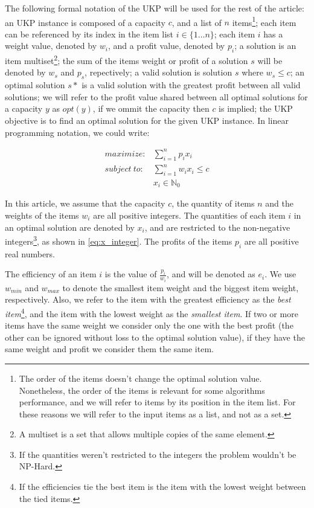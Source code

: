 \documentclass[runningheads,a4paper]{llncs}
\begin{document}
The following formal notation of the UKP will be used for the rest of the article: an UKP instance is composed of a capacity \(c\), and a list of \(n\) items\footnote{The order of the items doesn't change the optimal solution value. Nonetheless, the order of the items is relevant for some algorithms performance, and we will refer to items by its position in the item list. For these reasons we will refer to the input items as a list, and not as a set.}; each item can be referenced by its index in the item list \(i \in \{1\dots n\}\); each item \(i\) has a weight value, denoted by \(w_i\), and a profit value, denoted by \(p_i\); a solution is an item multiset\footnote{A multiset is a set that allows multiple copies of the same element.}; the sum of the items weight or profit of a solution \(s\) will be denoted by \(w_s\) and \(p_s\), repectively; a valid solution is solution \(s\) where \(w_s \leq c\); an optimal solution \(s*\) is a valid solution with the greatest profit between all valid solutions; we will refer to the profit value shared between all optimal solutions for a capacity \(y\) as \(opt(y)\), if we ommit the capacity then \(c\) is implied; the UKP objective is to find an optimal solution for the given UKP instance. In linear programming notation, we could write:

\begin{align}
  maximize: &\sum_{i=1}^n p_i x_i\label{eq:objfun}\\
subject~to: &\sum_{i=1}^n w_i x_i \leq c\label{eq:capcons}\\
            &x_i \in \mathbb{N}_0\label{eq:x_integer}
\end{align}

In this article, we assume that the capacity \(c\), the quantity of items \(n\) and the weights of the items \(w_i\) are all positive integers. The quantities of each item \(i\) in an optimal solution are denoted by \(x_i\), and are restricted to the non-negative integers\footnote{If the quantities weren't restricted to the integers the problem wouldn't be NP-Hard.}, as shown in \eqref{eq:x_integer}. The profits of the items \(p_i\) are all positive real numbers.

The efficiency of an item \(i\) is the value of \(\frac{p_i}{w_i}\), and will be denoted as \(e_i\). We use \(w_{min}\) and \(w_{max}\) to denote the smallest item weight and the biggest item weight, respectively. Also, we refer to the item with the greatest efficiency as the \emph{best item}\footnote{If the efficiencies tie the best item is the item with the lowest weight between the tied items.}, and the item with the lowest weight as the \emph{smallest item}. If two or more items have the same weight we consider only the one with the best profit (the other can be ignored without loss to the optimal solution value), if they have the same weight and profit we consider them the same item.
\end{document}
